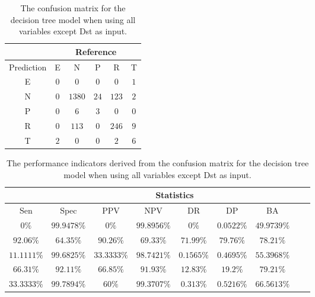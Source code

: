 \begin{table}[!ht]
	\centering
	\begin{tabular}{|c|c|c|c|c|c|}
		\hline
		 & \multicolumn{5}{|c|}{Reference} \\ \hline
		 Prediction & E & N & P & R & T \\ \hline
		 E & $0$ & $0$ & $0$ & $0$ & $1$ \\ \hline
		 N & $0$ & $1380$ & $24$ & $123$ & $2$ \\ \hline
		 P & $0$ & $6$ & $3$ & $0$ & $0$ \\ \hline
		 R & $0$ & $113$ & $0$ & $246$ & $9$ \\ \hline
		 T & $2$ & $0$ & $0$ & $2$ & $6$ \\ \hline
	\end{tabular}
	\caption{The confusion matrix for the decision tree model when using all variables except Dst as input.}
	\label{tab:cm:noDst:C5.0}
\end{table}

\begin{table}[!ht]
	\centering
	\begin{tabular}{|c|c|c|c|c|c|c|c|c|}
		\hline
		 & \multicolumn{7}{c|}{Statistics} \\ \hline
		Sen & Spec & PPV & NPV & DR & DP & BA \\ \hline
		$0\%$ & $99.9478\%$ & $0\%$ & $99.8956\%$ & $0\%$ & $0.0522\%$ & $49.9739\%$ \\ \hline
		$92.06\%$ & $64.35\%$ & $90.26\%$ & $69.33\%$ & $71.99\%$ & $79.76\%$ & $78.21\%$ \\ \hline
		$11.1111\%$ & $99.6825\%$ & $33.3333\%$ & $98.7421\%$ & $0.1565\%$ & $0.4695\%$ & $55.3968\%$ \\ \hline
		$66.31\%$ & $92.11\%$ & $66.85\%$ & $91.93\%$ & $12.83\%$ & $19.2\%$ & $79.21\%$ \\ \hline
		$33.3333\%$ & $99.7894\%$ & $60\%$ & $99.3707\%$ & $0.313\%$ & $0.5216\%$ & $66.5613\%$ \\ \hline
	\end{tabular}
	\caption{The performance indicators derived from the confusion matrix for the decision tree model when using all variables except Dst as input.}
	\label{tab:cs:noDst:C5.0}
\end{table}

